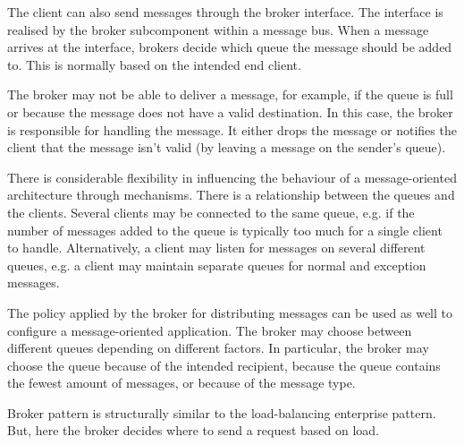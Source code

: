 \documentclass[a4paper, openany]{memoir}
\begin{document}
The client can also  send messages through the broker interface. The interface is realised by the broker subcomponent within a message bus. When a message arrives at the interface, brokers decide which queue the message should be added to. This is normally based on the intended end client.

The broker may not be able to deliver a message, for example, if the queue is full or because the message does not have a valid destination. In this case, the broker is responsible for handling the message. It either drops the message or notifies the client that the message isn't valid (by leaving a message on the sender's queue).

There is considerable flexibility in influencing the behaviour of a message-oriented architecture through mechanisms. There is a relationship between the queues and the clients. Several clients may be connected to the same queue, e.g. if the number of messages added to the queue is typically too much for a single client to handle. Alternatively, a client may listen for messages on several different queues, e.g. a client may maintain separate queues for normal and exception messages.

The policy applied by the broker for distributing messages can be used as well to configure a message-oriented application. The broker may choose between different queues depending on different factors. In particular, the broker may choose the queue because of the intended recipient, because the queue contains the fewest amount of messages, or because of the message type.

Broker pattern is structurally similar to the load-balancing enterprise pattern. But, here the broker decides where to send a request based on load.
\end{document}
